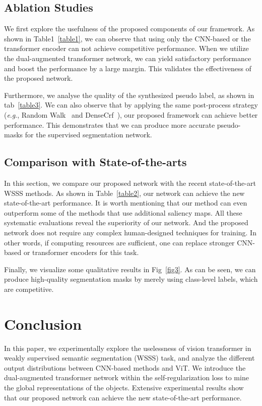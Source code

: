 \documentclass[journal]{IEEEtran}
\newcommand{\eg}{\textit{e}.\textit{g}., }
\begin{document}
\subsection{Ablation Studies}
We first explore the usefulness of the proposed components of our framework. As shown in Table1~\ref{table1}, we can observe that using only the CNN-based or the transformer encoder can not achieve competitive performance. When we utilize the dual-augmented transformer network, we can yield satisfactory performance and boost the performance by a large margin. This validates the effectiveness of the proposed network.

Furthermore, we analyse the quality of the synthesized pseudo label, as shown in tab~\ref{table3}. We can also observe that by applying the same post-process strategy (\eg Random Walk~\cite{ahn2018learning} and DenseCrf~\cite{krahenbuhl2011efficient}), our proposed framework can achieve better performance. This demonstrates that we can produce more accurate pseudo-masks for the supervised segmentation network.

\subsection{Comparison with State-of-the-arts}
In this section, we compare our proposed network with the recent state-of-the-art WSSS methods. As shown in Table~\ref{table2}, our network can achieve the new state-of-the-art performance. It is worth mentioning that our method can even outperform some of the methods that use additional saliency maps. All these systematic evaluations reveal the superiority of our network. And the proposed network does not require any complex human-designed techniques for training. In other words, if computing resources are sufficient, one can replace stronger CNN-based or transformer encoders for this task.

Finally, we visualize some qualitative results in Fig~\ref{fig3}. As can be seen, we can produce high-quality segmentation masks by merely using class-level labels, which are competitive.

\section{Conclusion}
In this paper, we experimentally explore the uselessness of vision transformer in weakly supervised semantic segmentation (WSSS) task, and analyze the different output distributions between CNN-based methods and ViT. We introduce the dual-augmented transformer network within the self-regularization loss to mine the global representations of the objects. Extensive experimental results show that our proposed network can achieve the new state-of-the-art performance.



\end{document}
